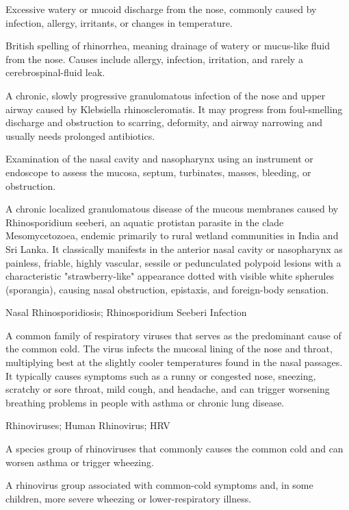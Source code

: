  Excessive watery or mucoid discharge from the nose, commonly caused by infection, allergy, irritants, or changes in temperature.

 British spelling of rhinorrhea, meaning drainage of watery or mucus-like fluid from the nose. Causes include allergy, infection, irritation, and rarely a cerebrospinal-fluid leak.

 A chronic, slowly progressive granulomatous infection of the nose and upper airway caused by Klebsiella rhinoscleromatis. It may progress from foul-smelling discharge and obstruction to scarring, deformity, and airway narrowing and usually needs prolonged antibiotics.

 Examination of the nasal cavity and nasopharynx using an instrument or endoscope to assess the mucosa, septum, turbinates, masses, bleeding, or obstruction.

 A chronic localized granulomatous disease of the mucous membranes caused by Rhinosporidium seeberi, an aquatic protistan parasite in the clade Mesomycetozoea, endemic primarily to rural wetland communities in India and Sri Lanka. It classically manifests in the anterior nasal cavity or nasopharynx as painless, friable, highly vascular, sessile or pedunculated polypoid lesions with a characteristic "strawberry-like" appearance dotted with visible white spherules (sporangia), causing nasal obstruction, epistaxis, and foreign-body sensation.

\synonyms
Nasal Rhinosporidiosis; Rhinosporidium Seeberi Infection

 A common family of respiratory viruses that serves as the predominant cause of the common cold. The virus infects the mucosal lining of the nose and throat, multiplying best at the slightly cooler temperatures found in the nasal passages. It typically causes symptoms such as a runny or congested nose, sneezing, scratchy or sore throat, mild cough, and headache, and can trigger worsening breathing problems in people with asthma or chronic lung disease.

\synonyms
Rhinoviruses; Human Rhinovirus; HRV

 A species group of rhinoviruses that commonly causes the common cold and can worsen asthma or trigger wheezing.

 A rhinovirus group associated with common-cold symptoms and, in some children, more severe wheezing or lower-respiratory illness.

